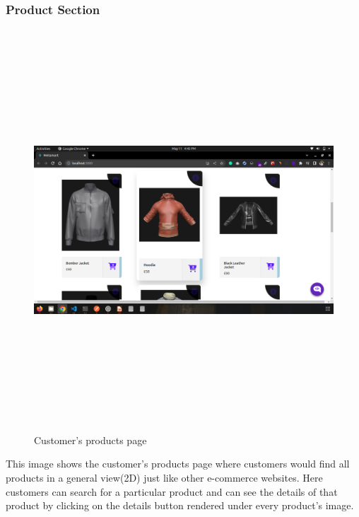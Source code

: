 \subsubsection{Product Section}
\begin{figure}[H]
    \centering
    \includegraphics[width=15cm,height=15cm]{Figures/Websites/Customer/CustomerProductList.png}
    \caption{Customer’s products page}
    \label{fig: Product section for customer}
\end{figure}
\justifying
This image shows the customer’s products page where customers would find all products in a general view(2D) just like other e-commerce websites. Here customers can search for a particular product and can see the details of that product by clicking on the details button rendered under every product’s image.
